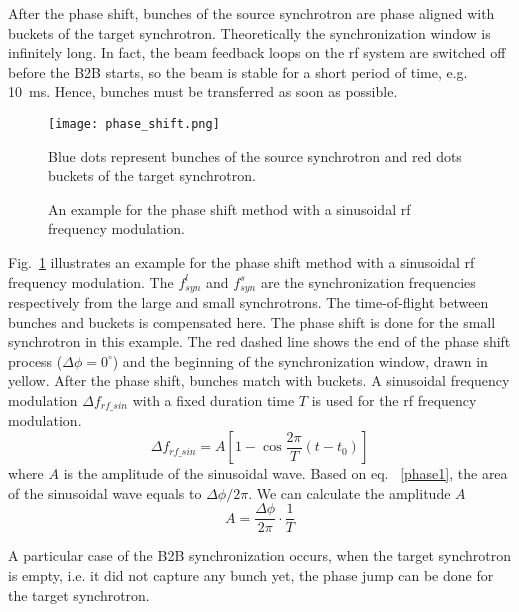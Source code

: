 After the phase shift, bunches of the source synchrotron are phase aligned with buckets of the target synchrotron. Theoretically the synchronization window is infinitely long. In fact, the beam feedback loops on the rf system are switched off before the B2B starts, so the beam is stable for a short period of time, e.g. \SI{10}{ms}. Hence, bunches must be transferred as soon as possible. 

\begin{figure}[!htb]
   \centering   
   \texttt{[image: phase\_shift.png]}
   \caption{An example for the phase shift method with a sinusoidal rf frequency modulation.}{Blue dots represent bunches of the source synchrotron and red dots buckets of the target synchrotron.}
   \label{phase_shift}
\end{figure}


Fig.~\ref{phase_shift} illustrates an example for the phase shift method with a sinusoidal rf frequency modulation. The $f_{\mathit{syn}}^{l}$ and $f_{\mathit{syn}}^{s}$ are the synchronization frequencies respectively from the large and small synchrotrons. The time-of-flight between bunches and buckets is compensated here. The phase shift is done for the small synchrotron in this example. The red dashed line shows the end of the phase shift process ($\Delta \phi=0^\circ$) and the beginning of the synchronization window, drawn in yellow. After the phase shift, bunches match with buckets. A sinusoidal frequency modulation $\Delta f_{\mathit{rf\_sin}}$ with a fixed duration time $T$ is used for the rf frequency modulation.
\begin{equation}
\Delta f_{\mathit{rf\_sin}}=A[1-\cos \frac{2\pi}{T}(t-t_0)]
\end{equation}
where $A$ is the amplitude of the sinusoidal wave. Based on eq. ~\ref{phase1}, the area of the sinusoidal wave equals to $\Delta \phi/2\pi$. We can calculate the amplitude $A$  
\begin{equation}
A= \frac{\Delta \phi}{2\pi}\cdot\frac{1}{T}
\end{equation}

A particular case of the B2B synchronization occurs, when the target synchrotron is empty, i.e. it did not capture any bunch yet, the phase jump can be done for the target synchrotron.

